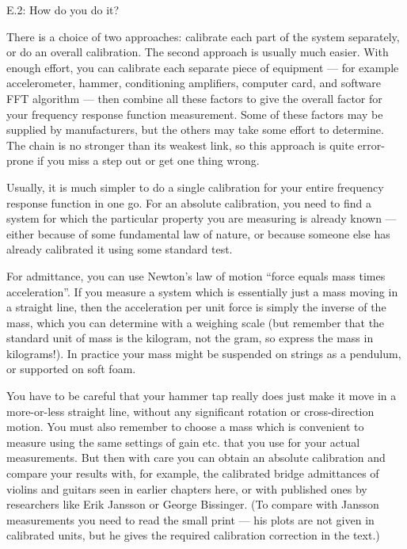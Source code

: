   E.2: How do you do it? 

  There is a choice of two approaches: calibrate each part of the system 
  separately, or do an overall calibration. The second approach is usually much 
  easier. With enough effort, you can calibrate each separate piece of 
  equipment — for example accelerometer, hammer, conditioning amplifiers, 
  computer card, and software FFT algorithm — then combine all these factors to 
  give the overall factor for your frequency response function measurement. 
  Some of these factors may be supplied by manufacturers, but the others may 
  take some effort to determine. The chain is no stronger than its weakest 
  link, so this approach is quite error-prone if you miss a step out or get one 
  thing wrong. 

  Usually, it is much simpler to do a single calibration for your entire 
  frequency response function in one go. For an absolute calibration, you need 
  to find a system for which the particular property you are measuring is 
  already known — either because of some fundamental law of nature, or because 
  someone else has already calibrated it using some standard test. 

  For admittance, you can use Newton’s law of motion “force equals mass times 
  acceleration”. If you measure a system which is essentially just a mass 
  moving in a straight line, then the acceleration per unit force is simply the 
  inverse of the mass, which you can determine with a weighing scale (but 
  remember that the standard unit of mass is the kilogram, not the gram, so 
  express the mass in kilograms!). In practice your mass might be suspended on 
  strings as a pendulum, or supported on soft foam. 

  You have to be careful that your hammer tap really does just make it move in 
  a more-or-less straight line, without any significant rotation or 
  cross-direction motion. You must also remember to choose a mass which is 
  convenient to measure using the same settings of gain etc. that you use for 
  your actual measurements. But then with care you can obtain an absolute 
  calibration and compare your results with, for example, the calibrated bridge 
  admittances of violins and guitars seen in earlier chapters here, or with 
  published ones by researchers like Erik Jansson or George Bissinger. (To 
  compare with Jansson measurements you need to read the small print — his 
  plots are not given in calibrated units, but he gives the required 
  calibration correction in the text.) 


